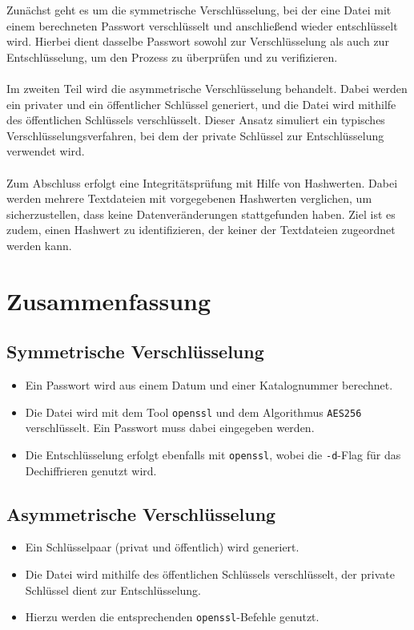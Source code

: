 \documentclass[a4paper]{article}
\begin{document}
Zunächst geht es um die symmetrische Verschlüsselung, bei der eine Datei mit einem berechneten Passwort verschlüsselt und anschließend wieder entschlüsselt wird. Hierbei dient dasselbe Passwort sowohl zur Verschlüsselung als auch zur Entschlüsselung, um den Prozess zu überprüfen und zu verifizieren.
\\\\
Im zweiten Teil wird die asymmetrische Verschlüsselung behandelt. Dabei werden ein privater und ein öffentlicher Schlüssel generiert, und die Datei wird mithilfe des öffentlichen Schlüssels verschlüsselt. Dieser Ansatz simuliert ein typisches Verschlüsselungsverfahren, bei dem der private Schlüssel zur Entschlüsselung verwendet wird.
\\\\
Zum Abschluss erfolgt eine Integritätsprüfung mit Hilfe von Hashwerten. Dabei werden mehrere Textdateien mit vorgegebenen Hashwerten verglichen, um sicherzustellen, dass keine Datenveränderungen stattgefunden haben. Ziel ist es zudem, einen Hashwert zu identifizieren, der keiner der Textdateien zugeordnet werden kann.

\section{Zusammenfassung}

\subsection{Symmetrische Verschlüsselung}
\begin{itemize}
	\item Ein Passwort wird aus einem Datum und einer Katalognummer berechnet.
	\item Die Datei wird mit dem Tool \texttt{openssl} und dem Algorithmus \texttt{AES256} verschlüsselt. Ein Passwort muss dabei eingegeben werden.
	\item Die Entschlüsselung erfolgt ebenfalls mit \texttt{openssl}, wobei die \texttt{-d}-Flag für das Dechiffrieren genutzt wird.
\end{itemize}

\subsection{Asymmetrische Verschlüsselung}
\begin{itemize}
	\item Ein Schlüsselpaar (privat und öffentlich) wird generiert.
	\item Die Datei wird mithilfe des öffentlichen Schlüssels verschlüsselt, der private Schlüssel dient zur Entschlüsselung.
	\item Hierzu werden die entsprechenden \texttt{openssl}-Befehle genutzt.
\end{itemize}
\end{document}
